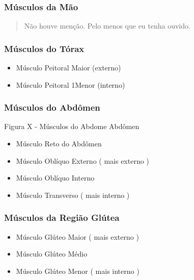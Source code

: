 \documentclass[
]{book}
\providecommand{\tightlist}{%
  \setlength{\itemsep}{0pt}\setlength{\parskip}{0pt}}
\begin{document}
\hypertarget{muxfasculos-da-muxe3o}{%
\subsubsection{Músculos da Mão}\label{muxfasculos-da-muxe3o}}

\begin{quote}
Não houve menção. Pelo menos que eu tenha ouvido.
\end{quote}

\hypertarget{muxfasculos-do-tuxf3rax}{%
\subsubsection{Músculos do Tórax}\label{muxfasculos-do-tuxf3rax}}

\begin{itemize}
\tightlist
\item
  Músculo Peitoral Maior (externo)
\item
  Músculo Peitoral 1Menor (interno)
\end{itemize}

\hypertarget{muxfasculos-do-abduxf4men}{%
\subsubsection{Músculos do Abdômen}\label{muxfasculos-do-abduxf4men}}

Figura X - Músculos do Abdome \textbar{} Abdômen

\begin{itemize}
\tightlist
\item
  Músculo Reto do Abdômen
\item
  Músculo Oblíquo Externo ( mais externo )
\item
  Músculo Oblíquo Interno
\item
  Músculo Transverso ( mais interno )
\end{itemize}

\hypertarget{muxfasculos-da-regiuxe3o-gluxfatea}{%
\subsubsection{Músculos da Região Glútea}\label{muxfasculos-da-regiuxe3o-gluxfatea}}

\begin{itemize}
\tightlist
\item
  Músculo Glúteo Maior ( mais externo )
\item
  Músculo Glúteo Médio
\item
  Músculo Glúteo Menor ( mais interno )
\end{itemize}
\end{document}
